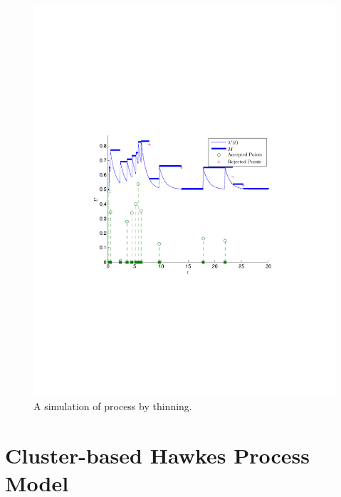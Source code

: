  \begin{figure}[H]
  	\centering
  	\includegraphics[trim = 0.8cm 8.5cm 0.8cm 8cm,clip,width=1.00\textwidth ]{Hawkess_Thinning.pdf}
  	\caption{A simulation of process by thinning.}
  	\label{Example_Thinning}
  \end{figure}


\section{Cluster-based Hawkes Process Model}

